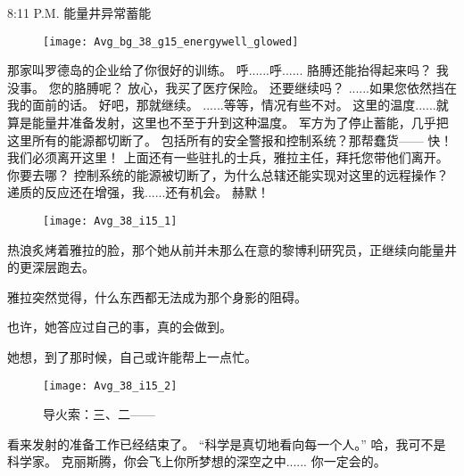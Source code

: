 \documentclass[openany]{book}
\begin{document}
8:11 P.M. 能量井异常蓄能
\begin{figure}[h]
    \centering
    \texttt{[image: Avg\_bg\_38\_g15\_energywell\_glowed]}
\end{figure}
\begin{dialogue}
     那家叫罗德岛的企业给了你很好的训练。
     呼......呼......
     胳膊还能抬得起来吗？
     我没事。
     您的胳膊呢？
     放心，我买了医疗保险。
     还要继续吗？
     ......如果您依然挡在我的面前的话。
     好吧，那就继续。
     ......等等，情况有些不对。
     这里的温度......就算是能量井准备发射，这里也不至于升到这种温度。
     军方为了停止蓄能，几乎把这里所有的能源都切断了。
     包括所有的安全警报和控制系统？那帮蠢货——
     快！我们必须离开这里！
     上面还有一些驻扎的士兵，雅拉主任，拜托您带他们离开。
     你要去哪？
     控制系统的能源被切断了，为什么总辖还能实现对这里的远程操作？
     递质的反应还在增强，我......还有机会。
     赫默！\par
    \begin{figure}[h]
        \centering
        \texttt{[image: Avg\_38\_i15\_1]}
    \end{figure}
    热浪炙烤着雅拉的脸，那个她从前并未那么在意的黎博利研究员，正继续向能量井的更深层跑去。\par
    雅拉突然觉得，什么东西都无法成为那个身影的阻碍。\par
    也许，她答应过自己的事，真的会做到。\par
    她想，到了那时候，自己或许能帮上一点忙。
    \begin{figure}[h]
        \caption*{导火索：三、二——}
        \centering
        \texttt{[image: Avg\_38\_i15\_2]}
    \end{figure}
     看来发射的准备工作已经结束了。
     “科学是真切地看向每一个人。”
     哈，我可不是科学家。
     克丽斯腾，你会飞上你所梦想的深空之中......
     你一定会的。
\end{dialogue}
\end{document}
